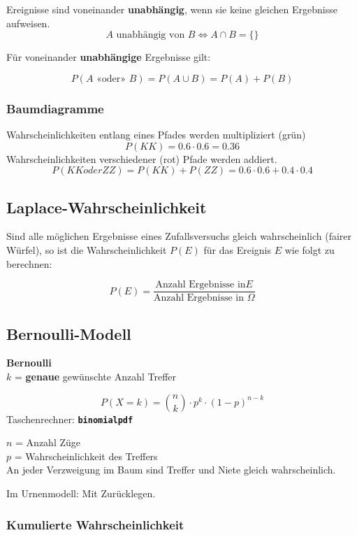 \begin{multicols}{2}
Ereignisse sind voneinander \textbf{unabhängig}, wenn sie keine
gleichen Ergebnisse aufweisen.
$$A \textrm{ unabhängig von } B \Leftrightarrow A\cap B=\{\}$$

Für voneinander \textbf{unabhängige} Ergebnisse 
gilt:

$$P(A\textrm{ «oder» }B) = P(A\cup B) = P(A) + P(B)$$

\forceCB
\subsubsection*{Baumdiagramme}


Wahrscheinlichkeiten entlang eines Pfades werden multipliziert (grün)
$$P(KK) = 0.6\cdot0.6=0.36$$
Wahrscheinlichkeiten verschiedener (rot) Pfade werden addiert.
$$P(KK oder ZZ) = P(KK) + P(ZZ) =0.6\cdot0.6 + 0.4\cdot0.4$$

\subsection*{Laplace-Wahrscheinlichkeit}
Sind alle möglichen Ergebnisse eines Zufallsversuchs gleich
wahrscheinlich (fairer Würfel), so ist die Wahrscheinlichkeit $P(E)$ für das Ereignis
$E$ wie folgt zu berechnen:

$$P(E) = \frac{\textrm{Anzahl Ergebnisse in
}E}{\textrm{Anzahl Ergebnisse in }\Omega}$$


\subsection*{Bernoulli-Modell}

\begin{tcolorbox}[colback=white]
\textbf{Bernoulli}\\
$k$ = \textbf{genaue} gewünschte Anzahl Treffer

$$P(X=k) = {n \choose k}\cdot{}p^k\cdot{}(1-p)^{n-k}$$
Taschenrechner:  \textbf{\texttt{binomialpdf}}

$n$ = Anzahl Züge\\
$p$ = Wahrscheinlichkeit des Treffers\\

An jeder Verzweigung im Baum sind Treffer und Niete gleich
wahrscheinlich.

Im Urnenmodell: Mit Zurücklegen.
\end{tcolorbox}

\subsubsection*{Kumulierte Wahrscheinlichkeit}


\end{multicols}
